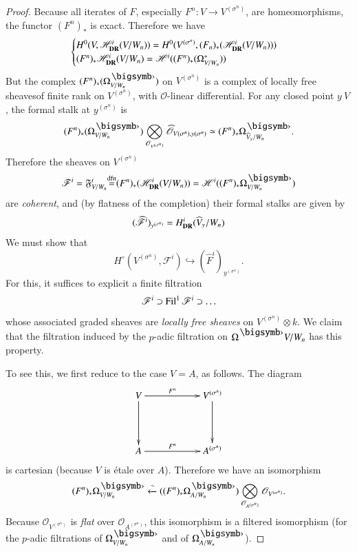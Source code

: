 \begin{proof}
Because all iterates of $F$, especially $F^{n}:V\to V^{(\sigma^{n})}$, are homeomorphisms, the functor $(F^{n})_{*}$ is exact. Therefore we have
$$
\begin{cases}
H^{0}(V,\mathscr{H}^{i}_{\mathbf{DR}}(V/W_{n}))=H^{0}(V^{(\sigma^{n})},(F_{n})_{*}(\mathscr{H}^{i}_{\mathbf{DR}}(V/W_{n})))\\
(F^{n})_{*}\mathscr{H}^{i}_{\mathbf{DR}}(V/W_{n})=\mathscr{H}^{i}((F^{n})_{*}(\Omega^{*}_{V/W_{n}}))
\end{cases}
$$
But the complex $(F^{n})_{*}(\Omega^{\bigdot}_{V/W_{n}})$ on $V^{(\sigma^{n})}$ is a complex of locally free sheaves\pageoriginale of finite rank on $V^{(\sigma^{n})}$, with $\mathscr{O}$-linear differential. For any closed point $y \ V$, the formal stalk at $y^{(\sigma^{n})}$ is
$$
(F^{n})_{*}(\Omega^{\bigdot}_{V/W_{n}})\bigotimes\limits_{\mathscr{O}_{V^{(\sigma^{n})}}}\widehat{\mathscr{O}}_{V(\sigma^{n}),y(\sigma^{n})}\simeq (F^{n})_{*}\Omega^{\bigdot}_{\widehat{V}_{y}/W_{n}}.
$$
Therefore the sheaves on $V^{(\sigma^{n})}$
$$
\mathscr{F}^{i}=\mathfrak{F}^{i}_{V/W_{n}} {\displaystyle{\mathop{=}\limits^{\text{dfn}}}}(F^{n})_{*}(\mathscr{H}^{i}_{\DR}(V/W_{n}))=\mathscr{H}^{i}((F^{n})_{*}\Omega^{\bigdot}_{V/W_{n}})
$$
are {\em coherent}, and (by flatness of the completion) their formal stalks are given by
$$
(\widehat{\mathscr{F}}^{i})_{y^{(\sigma^{n})}}=H^{i}_{\mathbf{DR}}(\widehat{V}_{y}/W_{n})
$$
We must show that
$$
H^{\circ}(V^{(\sigma^{n})},\mathscr{F}^{i})\hookrightarrow (\widehat{F}^{i})_{y^{(\sigma^{n})}}.
$$
For this, it suffices to explicit a finite filtration
$$
\mathscr{F}^{i}\supset \operatorname{Fil}^{1}\mathscr{F}^{i}\supset \ldots
$$
whose associated graded sheaves are {\em locally free sheaves} on $V^{(\sigma^{n})}\otimes k$. We claim that the filtration induced by the $p$-adic filtration on $\Omega^{\bigdot}V/W_{n}$ has this property.

To see this, we first reduce to the case $V=A$, as follows. The diagram
\[
\xymatrix@C=2cm@R=1.5cm{
V\ar[r]^-{F^{n}}\ar[d] & V^{(\sigma^{n})}\ar[d]\\
A\ar[r]^-{F^{n}} & A^{(\sigma^{n})}
}
\]
is cartesian (because $V$ is \'etale over $A$). Therefore we have an isomorphism
$$
(F^{n})_{*}\Omega^{\bigdot}_{V/W_{n}}\xleftarrow{\sim}((F^{n})_{*}\Omega^{\bigdot}_{A/W_{n}}) \bigotimes\limits_{\mathscr{O}_{A^{(\sigma^{n})}}}\mathscr{O}_{V^{(\sigma^{n})}}.
$$
Because $\mathscr{O}_{V^{(\sigma^{n})}}$ is {\em flat} over $\mathscr{O}_{A^{(\sigma^{n})}}$, this isomorphism is a filtered isomorphism (for the $p$-adic filtrations of $\Omega^{\bigdot}_{V/W_{n}}$ and of $\Omega^{\bigdot}_{A/W_{n}}$).


\end{proof}
